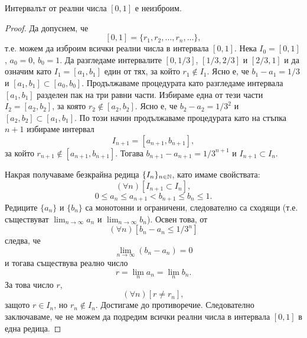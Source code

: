 \begin{thm}[Кантор]
  Интервалът от реални числа $[0,1]$ е неизброим.
\end{thm}
\begin{proof}
  Да допуснем, че
  \[[0,1] = \{r_1,r_2,\dots,r_n,\dots\},\]
  т.е. можем да изброим всички реални числа в интервала $[0,1]$.
  Нека $I_0 = [0, 1]$, $a_0 = 0$, $b_0 = 1$.
  Да разгледаме интервалите $[0,1/3]$, $[1/3,2/3]$ и $[2/3,1]$ 
  и да означим като $I_1 = [a_1,b_1]$ един от тях, за който $r_1 \not\in I_1$.
  Ясно е, че $b_1-a_1 = 1/3$ и $[a_1,b_1] \subset [a_0,b_0]$.
  Продължаваме процедурата като разгледаме интервала $[a_1,b_1]$ разделен пак на три равни части.
  Избираме една от тези части $I_2 = [a_2,b_2]$, за която $r_2 \not\in [a_2,b_2]$.
  Ясно е, че $b_2-a_2 = 1/3^2$ и $[a_2,b_2] \subset [a_1,b_1]$.
  По този начин продължаваме процедурата като на стъпка $n+1$ 
  избираме интервал 
  \[I_{n+1} = [a_{n+1},b_{n+1}],\] за който $r_{n+1} \not\in [a_{n+1},b_{n+1}]$.
  Тогава $b_{n+1}-a_{n+1} = 1/3^{n+1}$ и $I_{n+1} \subset I_n$.

  Накрая получаваме безкрайна редица $\{I_n\}_{n\in\mathbb{N}}$, като имаме свойствата:
  \[(\forall n)[I_{n+1}\subset I_n],\]
  \[0\leq a_n \leq a_{n+1} < b_{n+1} \leq b_n \leq 1.\]
  Редиците $\{a_n\}$ и $\{b_n\}$ са монотонни и ограничени, следователно са сходящи 
  (т.е. съществуват $\lim_{n\to\infty} a_n$ и $\lim_{n\to\infty} b_n$).
  Освен това, от \[(\forall n)[b_n-a_n \leq 1/3^n]\] следва, че 
  \[\lim_{n\to\infty}(b_n-a_n) = 0\] и тогава съществува реално число 
  \[r = \lim_n a_n = \lim_n b_n.\]
  За това число $r$,
  \[(\forall n)[r \neq r_n],\]
  защото $r \in I_n$, но $r_n \not\in I_n$.
  Достигаме до противоречие.
  Следователно заключаваме, че не можем да подредим всички реални числа в интервала $[0,1]$
  в една редица.
\end{proof}


